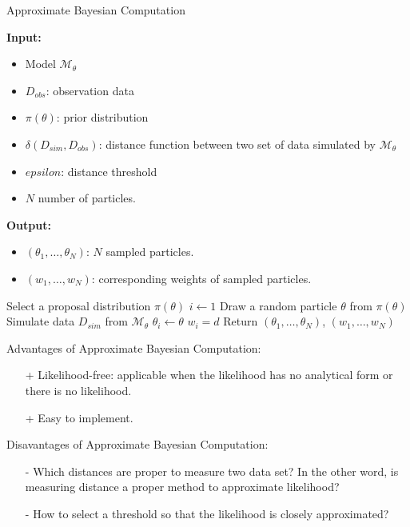 \begin{algorithm}[H]
    \caption{Approximate Bayesian Computation}
    \label{alg:abc-reject}
    \footnotesize{
        \hspace*{\algorithmicindent} \textbf{Input:}
        \begin{itemize}[noitemsep,topsep=0pt]
            \item Model $\mathcal{M}_\theta$
            \item $D_{obs}$: observation data
            \item $\pi(\theta)$: prior distribution
            \item $\delta(D_{sim}, D_{obs})$: distance function between two set of data simulated by $\mathcal{M}_\theta$
            \item $epsilon$: distance threshold
            \item $N$ number of particles.
        \end{itemize}
        \hspace*{\algorithmicindent} \textbf{Output:}
        \begin{itemize}[noitemsep]
            \item $(\theta_1,\ldots,\theta_N)$: $N$ sampled particles.
            \item $(w_1,\ldots,w_N)$: corresponding weights of sampled particles.
        \end{itemize}
    }
    \begin{algorithmic}[1]
        \State Select a proposal distribution $\pi(\theta)$
        \State $i \leftarrow 1$
        \State Draw a random particle $\theta$ from $\pi(\theta)$
        \State Simulate data $D_{sim}$ from $\mathcal{M}_\theta$
        \State $\theta_i \leftarrow \theta$
        \State $w_i = d$
        \EndIf
        \EndWhile
        \State Return $(\theta_1,\ldots,\theta_N)$, $(w_1,\ldots,w_N)$
        \EndProcedure
    \end{algorithmic}
\end{algorithm}
Advantages of Approximate Bayesian Computation:
\begin{itemize}
    \item[+] Likelihood-free: applicable when the likelihood has no analytical form or there is no likelihood.
    \item[+] Easy to implement.
\end{itemize}
Disavantages of Approximate Bayesian Computation:
\begin{itemize}
    \item[-] Which distances are proper to measure two data set? In the other word, is measuring
          distance a proper method to approximate likelihood?
    \item[-] How to select a threshold so that the likelihood is closely approximated?
\end{itemize}

